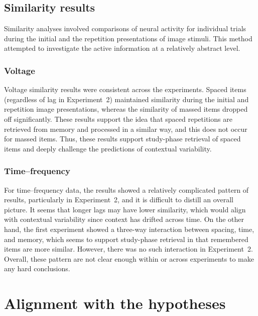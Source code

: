 \subsection{Similarity results}

Similarity analyses involved comparisons of neural activity for individual trials during the initial and the repetition presentations of image stimuli.  This method attempted to investigate the active information at a relatively abstract level.

\subsubsection{Voltage}

Voltage similarity results were consistent across the experiments.  Spaced items (regardless of lag in Experiment~2) maintained similarity during the initial and repetition image presentations, whereas the similarity of massed items dropped off significantly.  These results support the idea that spaced repetitions are retrieved from memory and processed in a similar way, and this does not occur for massed items.  Thus, these results support study-phase retrieval of spaced items and deeply challenge the predictions of contextual variability.

\subsubsection{Time--frequency}

For time--frequency data, the results showed a relatively complicated pattern of results, particularly in Experiment~2, and it is difficult to distill an overall picture.  It seems that longer lags may have lower similarity, which would align with contextual variability since context has drifted across time.
On the other hand, the first experiment showed a three-way interaction between spacing, time, and memory, which seems to support study-phase retrieval in that remembered items are more similar.  However, there was no such interaction in Experiment~2.  Overall, these pattern are not clear enough within or across experiments to make any hard conclusions.




\section{Alignment with the hypotheses}

